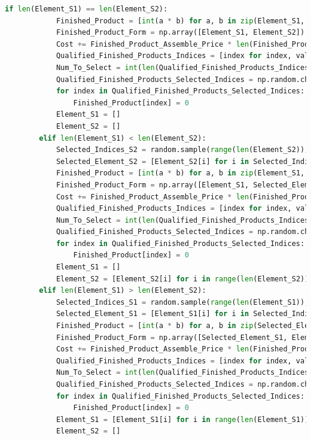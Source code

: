 \documentclass[withoutpreface,bwprint]{cumcmthesis} %
\begin{document}
\begin{appendices}
\begin{lstlisting}[language=python]
		if len(Element_S1) == len(Element_S2):
			Finished_Product = [int(a * b) for a, b in zip(Element_S1, Element_S2)]
			Finished_Product_Form = np.array([Element_S1, Element_S2])
			Cost += Finished_Product_Assemble_Price * len(Finished_Product)
			Qualified_Finished_Products_Indices = [index for index, value in enumerate(Finished_Product) if value == 1]
			Num_To_Select = int(len(Qualified_Finished_Products_Indices) * Perturbed_Finished_Product_Defect_Rate)
			Qualified_Finished_Products_Selected_Indices = np.random.choice(Qualified_Finished_Products_Indices, size=Num_To_Select, replace=False)
			for index in Qualified_Finished_Products_Selected_Indices:
				Finished_Product[index] = 0
			Element_S1 = []
			Element_S2 = []
		elif len(Element_S1) < len(Element_S2):
			Selected_Indices_S2 = random.sample(range(len(Element_S2)), len(Element_S1))
			Selected_Element_S2 = [Element_S2[i] for i in Selected_Indices_S2]
			Finished_Product = [int(a * b) for a, b in zip(Element_S1, Selected_Element_S2)]
			Finished_Product_Form = np.array([Element_S1, Selected_Element_S2])
			Cost += Finished_Product_Assemble_Price * len(Finished_Product)
			Qualified_Finished_Products_Indices = [index for index, value in enumerate(Finished_Product) if value == 1]
			Num_To_Select = int(len(Qualified_Finished_Products_Indices) * Perturbed_Finished_Product_Defect_Rate)
			Qualified_Finished_Products_Selected_Indices = np.random.choice(Qualified_Finished_Products_Indices, size=Num_To_Select, replace=False)
			for index in Qualified_Finished_Products_Selected_Indices:
				Finished_Product[index] = 0
			Element_S1 = []
			Element_S2 = [Element_S2[i] for i in range(len(Element_S2)) if i not in Selected_Indices_S2]
		elif len(Element_S1) > len(Element_S2):
			Selected_Indices_S1 = random.sample(range(len(Element_S1)), len(Element_S2))
			Selected_Element_S1 = [Element_S1[i] for i in Selected_Indices_S1]
			Finished_Product = [int(a * b) for a, b in zip(Selected_Element_S1, Element_S2)]
			Finished_Product_Form = np.array([Selected_Element_S1, Element_S2])
			Cost += Finished_Product_Assemble_Price * len(Finished_Product)
			Qualified_Finished_Products_Indices = [index for index, value in enumerate(Finished_Product) if value == 1]
			Num_To_Select = int(len(Qualified_Finished_Products_Indices) * Perturbed_Finished_Product_Defect_Rate)
			Qualified_Finished_Products_Selected_Indices = np.random.choice(Qualified_Finished_Products_Indices, size=Num_To_Select, replace=False)
			for index in Qualified_Finished_Products_Selected_Indices:
				Finished_Product[index] = 0
			Element_S1 = [Element_S1[i] for i in range(len(Element_S1)) if i not in Selected_Indices_S1]
			Element_S2 = []
	

\end{lstlisting}
\end{appendices}
\end{document}
